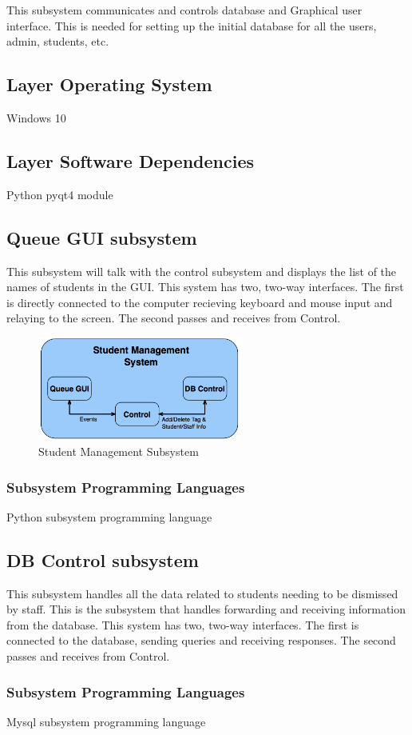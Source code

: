 This subsystem communicates and controls database and Graphical user interface. This is needed
for setting up the initial database for all the users, admin, students, etc.

\subsection{Layer Operating System}
Windows 10

\subsection{Layer Software Dependencies}
Python pyqt4 module 

\subsection{Queue GUI subsystem}
This subsystem will talk with the control subsystem and displays the list of the names of students
in the GUI. This system has two, two-way interfaces. The first is directly connected to the computer recieving
keyboard and mouse input and relaying to the screen. The second passes and receives from Control.

\begin{figure}[h!]
	\centering
 	\includegraphics[width=0.60\textwidth]{images/ads_3}
 \caption{Student Management Subsystem}
\end{figure}


\subsubsection{Subsystem Programming Languages}
Python subsystem programming language

\subsection{DB Control subsystem}
This subsystem handles all the data related to students needing to be dismissed by staff. This is the
subsystem that handles forwarding and receiving information from the database. This system has two, two-way interfaces. The first is connected to the database, sending queries and receiving responses. The second passes and receives from Control.


\subsubsection{Subsystem Programming Languages}
Mysql subsystem programming language




